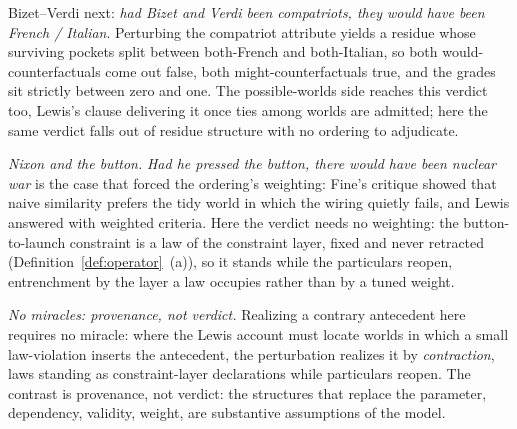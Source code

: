Bizet--Verdi next: \emph{had Bizet and Verdi been compatriots, they would have been French / Italian}. Perturbing the compatriot attribute yields a residue whose surviving pockets split between both-French and both-Italian, so both would-counterfactuals come out false, both might-counterfactuals true, and the grades sit strictly between zero and one. The possible-worlds side reaches this verdict too, Lewis's clause delivering it once ties among worlds are admitted; here the same verdict falls out of residue structure with no ordering to adjudicate.

\textit{Nixon and the button.} \emph{Had he pressed the button, there would have been nuclear war} is the case that forced the ordering's weighting: Fine's critique \parencite*{fine1975} showed that naive similarity prefers the tidy world in which the wiring quietly fails, and Lewis answered with weighted criteria. Here the verdict needs no weighting: the button-to-launch constraint is a law of the constraint layer, fixed and never retracted (Definition~\ref{def:operator}~(a)), so it stands while the particulars reopen, entrenchment by the layer a law occupies rather than by a tuned weight.

\textit{No miracles: provenance, not verdict.} Realizing a contrary antecedent here requires no miracle: where the Lewis account must locate worlds in which a small law-violation inserts the antecedent, the perturbation realizes it by \emph{contraction}, laws standing as constraint-layer declarations while particulars reopen. The contrast is provenance, not verdict: the structures that replace the parameter, dependency, validity, weight, are substantive assumptions of the model.

